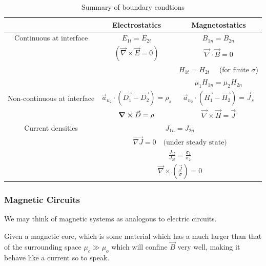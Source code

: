 \documentclass[10pt]{article}
\begin{document}
\begin{review}

\begin{table}[H]
	\centering
	\caption{Summary of boundary condtions}
	\label{tab:259:boundary_conditions}
	\begin{tabular}{|c|c|c|}
		\hline
													  & Electrostatics & Magnetostatics   \\ \hline
		Continuous at interface &  $ E_{1t} = E_{2t}   $ & $ B_{1n} = B_{2n}  $  \\ 
														& $(\vec{\nabla} \times  \vec{E} = 0)$ & $\vec{\nabla} \cdot   \vec{B} = 0$ \\ 
														& & $ H_{1t} = H_{2t} \quad $ (for finite $ \sigma $)   \\
														& & $ \mu_1 H_{1n} = \mu_2 H_{2n} $ \\
														\hline
		Non-continuous at interface & $ \vec{a}_{n_2} \cdot  ( \vec{D_1} - \vec{D_2}) = \rho_s $ &  $ \vec{a}_{n_2} \cdot  ( \vec{H_1} - \vec{H_2}) = \vec{J}_s  $ \\
																& $ \curl  \vec{D} = \rho $  & $\vec{\nabla} \times \vec{H} = \vec{J}  $ \\
																\hline
		Current densities & \multicolumn{2}{c|}{$ J_{1n} = J_{2n} $ } \\
											& \multicolumn{2}{c|}{$ \vec{\nabla{J}} = 0 \quad \text{(under steady state)} $} \\
											& \multicolumn{2}{c|}{$ \frac{J_{1t}}{J_{2t}} = \frac{\sigma_1}{\sigma_2} $} \\
											& \multicolumn{2}{c|}{$\vec{\nabla} \times (\frac{\vec{J}}{\sigma}) = 0$} \\
		\hline
	\end{tabular}
\end{table}

\end{review}


\subsubsection{Magnetic Circuits}

We may think of magnetic systems as analogous to electric circuits.

Given a magnetic core, which is some material which has a much larger than that of the surrounding space $ \mu_c \gg \mu_o $ which will confine $ \vec{B} $ very well, making it behave like a current so to speak.
\end{document}
